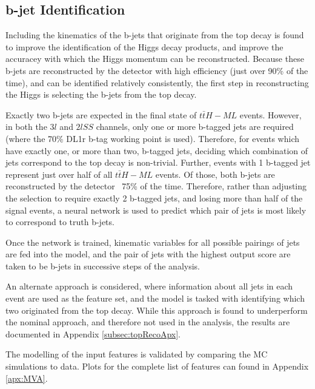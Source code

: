 \subsection{b-jet Identification}
\label{sec:bjetID}

Including the kinematics of the b-jets that originate from the top decay is found to improve the identification of the Higgs decay products, and improve the accuracey with which the Higgs momentum can be reconstructed. Because these b-jets are reconstructed by the detector with high efficiency (just over 90\% of the time), and can be identified relatively consistently, the first step in reconstructing the Higgs is selecting the b-jets from the top decay.

Exactly two b-jets are expected in the final state of $t\bar{t}H-ML$ events. However, in both the $3l$  and $2lSS$ channels, only one or more b-tagged jets are required (where the 70\% DL1r b-tag working point is used). Therefore, for events which have exactly one, or more than two, b-tagged jets, deciding which combination of jets correspond to the top decay is non-trivial. Further, events with 1 b-tagged jet represent just over half of all $t\bar{t}H-ML$ events. Of those, both b-jets are reconstructed by the detector ~75\% of the time. Therefore, rather than adjusting the selection to require exactly 2 b-tagged jets, and losing more than half of the signal events, a neural network is used to predict which pair of jets is most likely to correspond to truth b-jets.

Once the network is trained, kinematic variables for all possible pairings of jets are fed into the model, and the pair of jets with the highest output score are taken to be b-jets in successive steps of the analysis. 

An alternate approach is considered, where information about all jets in each event are used as the feature set, and the model is tasked with identifying which two originated from the top decay. While this approach is found to underperform the nominal approach, and therefore not used in the analysis, the results are documented in Appendix \ref{subsec:topRecoApx}.

The modelling of the input features is validated by comparing the MC simulations to data. Plots for the complete list of features can found in Appendix \ref{apx:MVA}.

